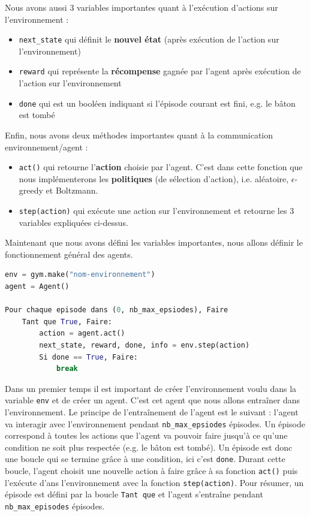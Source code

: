 \documentclass[10pt,a4paper]{article}
\begin{document}
Nous avons aussi 3 variables importantes quant à l'exécution d'actions sur l'environnement :
\begin{itemize}
	\item \lstinline{next_state} qui définit le \textbf{nouvel état} (après exécution de l'action sur l'environnement)
	\item \lstinline{reward} qui représente la \textbf{récompense} gagnée par l'agent après exécution de l'action sur l'environnement
	\item \lstinline{done} qui est un booléen indiquant si l'épisode courant est fini, e.g. le bâton est tombé
\end{itemize}

Enfin, nous avons deux méthodes importantes quant à la communication environnement/agent :
\begin{itemize}
	\item \lstinline{act()} qui retourne l'\textbf{action} choisie par l'agent. C'est dans cette fonction que nous implémenterons les \textbf{politiques} (de sélection d'action), i.e. aléatoire, $\epsilon$-greedy et Boltzmann. 
	\item \lstinline{step(action)} qui exécute une action sur l'environnement et retourne les 3 variables expliquées ci-dessus. 
\end{itemize}

Maintenant que nous avons défini les variables importantes, nous allons définir le fonctionnement général des agents.

\begin{lstlisting}[language=Python, caption=Pseudo-code du fonctionnement de l'agent dans son environnement]
env = gym.make("nom-environnement")
agent = Agent()

Pour chaque episode dans (0, nb_max_epsiodes), Faire
    Tant que True, Faire:
        action = agent.act()
        next_state, reward, done, info = env.step(action)
        Si done == True, Faire:
            break
\end{lstlisting}

Dans un premier temps il est important de créer l'environnement voulu dans la variable \lstinline{env} et de créer un agent. C'est cet agent que nous allons entraîner dans l'environnement.
Le principe de l'entraînement de l'agent est le suivant : l'agent va interagir avec l'environnement pendant \lstinline{nb_max_epsiodes} épisodes. Un épisode correspond à toutes les actions que l'agent va pouvoir faire jusqu'à ce qu'une condition ne soit plus respectée (e.g. le bâton est tombé). Un épisode est donc une boucle qui se termine grâce à une condition, ici c'est \lstinline{done}. Durant cette boucle, l'agent choisit une nouvelle action à faire grâce à sa fonction \lstinline{act()} puis l'exécute d'ans l'environnement avec la fonction \lstinline{step(action)}. Pour résumer, un épisode est défini par la boucle \lstinline{Tant que} et l'agent s'entraîne pendant \lstinline{nb_max_episodes} épisodes.
\end{document}
